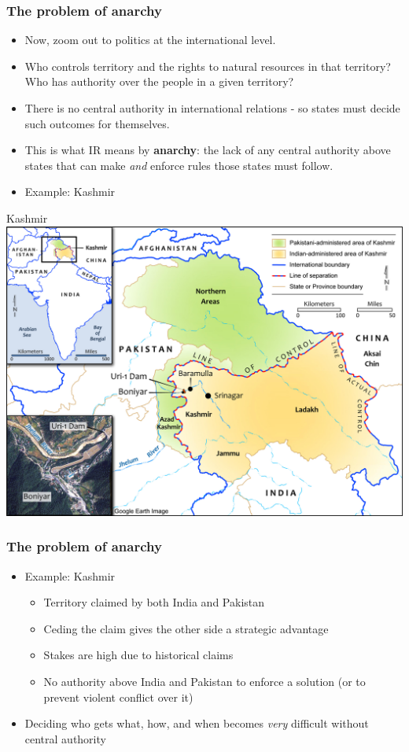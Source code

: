 \documentclass[handout]{beamer}
\begin{document}
\begin{frame} 
\frametitle{\LARGE{The problem of anarchy}}
\begin{itemize}
	\item Now, zoom out to politics at the international level. \pause
	\item Who controls territory and the rights to natural resources in that territory? Who has authority over the people in a given territory? \pause
    \item There is no central authority in international relations - so states must decide such outcomes for themselves. \pause
    \item This is what IR means by \textbf{anarchy}: the lack of any central authority above states that can make \textit{and} enforce rules those states must follow. \pause
    \item Example: Kashmir
\end{itemize}
\end{frame}

\begin{frame}{\LARGE Kashmir}
    \centering
\includegraphics[width=\textwidth,height=0.8\textheight,keepaspectratio]{Kashmir.jpg}
\end{frame}

\begin{frame} 
\frametitle{\LARGE{The problem of anarchy}}
\begin{itemize}
    \item Example: Kashmir
    \begin{itemize} 
        \item Territory claimed by both India and Pakistan \pause
        \item Ceding the claim gives the other side a strategic advantage \pause
        \item Stakes are high due to historical claims \pause
        \item No authority above India and Pakistan to enforce a solution (or to prevent violent conflict over it) \pause
    \end{itemize}
    \item Deciding who gets what, how, and when becomes \textit{very} difficult without central authority
\end{itemize}
\end{frame}
\end{document}
